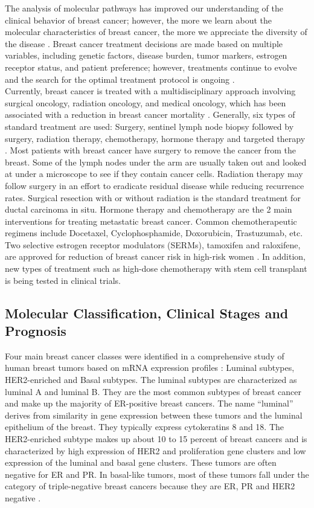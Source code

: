 \documentclass[a4paper,10pt]{article}
\begin{document}
The analysis of molecular pathways has improved our understanding of the clinical 
behavior of breast cancer; however, the more we learn about the molecular characteristics 
of breast cancer, the more we appreciate the diversity of the disease \cite{simpson1}\cite{komaki1}. Breast 
cancer treatment decisions are made based on multiple variables, including genetic 
factors, disease burden, tumor markers, estrogen receptor status, and patient preference; 
however, treatments continue to evolve and the search for the optimal treatment protocol is 
ongoing \cite{kesson1}. \\

Currently, breast cancer is treated with a multidisciplinary approach involving surgical 
oncology, radiation oncology, and medical oncology, which has been associated with a 
reduction in breast cancer mortality  \cite{kesson1}.  Generally, six types of standard treatment are used: 
Surgery, sentinel lymph node biopsy followed by surgery, radiation therapy, chemotherapy, 
hormone therapy and targeted therapy \cite{howard1}.  Most patients with breast cancer have surgery 
to remove the cancer from the breast. Some of the lymph nodes under the arm are usually 
taken out and looked at under a microscope to see if they contain cancer cells. Radiation 
therapy may follow surgery in an effort to eradicate residual disease while reducing 
recurrence rates. Surgical resection with or without radiation is the standard treatment for 
ductal carcinoma in situ. Hormone therapy and chemotherapy are the 2 main interventions
 for treating metastatic breast cancer. Common chemotherapeutic regimens include 
Docetaxel, Cyclophosphamide, Doxorubicin, Trastuzumab, etc.  Two selective estrogen 
receptor modulators (SERMs), tamoxifen and raloxifene, are approved for reduction of 
breast cancer risk in high-risk women \cite{desantis1}. In addition, new types of treatment such as 
high-dose chemotherapy with stem cell transplant is being tested in clinical trials. \\
\subsection{Molecular Classification, Clinical Stages and Prognosis}
Four main breast cancer classes were identified in a comprehensive study of human 
breast tumors based on mRNA  expression profiles \cite{Nature1}: Luminal subtypes, HER2-enriched 
and Basal subtypes. The luminal subtypes are characterized as luminal A and luminal B. 
They are the most common subtypes of breast cancer and make up the majority of 
ER-positive breast cancers. The name “luminal” derives from similarity in gene expression
 between these tumors and the luminal epithelium of the breast. They typically express 
cytokeratins 8 and 18. The HER2-enriched subtype makes up about 10 to 15 percent 
of breast cancers and is characterized by high expression of HER2 and proliferation
 gene clusters and low expression of the luminal and basal gene clusters. These 
tumors are often negative for ER and PR.  In basal-like tumors, most of these tumors 
fall under the category of triple-negative breast cancers because they are ER, PR and HER2 
negative \cite{Nature1}.\\
\end{document}
